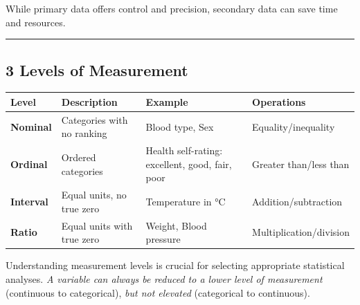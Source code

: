 \documentclass[
  letterpaper,
  DIV=11,
  numbers=noendperiod]{scrartcl}
\begin{document}
While primary data offers control and precision, secondary data can save
time and resources.

\begin{center}\rule{0.5\linewidth}{0.5pt}\end{center}

\subsection{\texorpdfstring{{3} {Levels of
Measurement}}{3 Levels of Measurement}}\label{levels-of-measurement}

\begin{longtable}[]{@{}
  >{\raggedright\arraybackslash}p{}
  >{\raggedright\arraybackslash}p{}
  >{\raggedright\arraybackslash}p{}
  >{\raggedright\arraybackslash}p{}@{}}
\toprule\noalign{}
\begin{minipage}[b]{\linewidth}\raggedright
Level
\end{minipage} & \begin{minipage}[b]{\linewidth}\raggedright
Description
\end{minipage} & \begin{minipage}[b]{\linewidth}\raggedright
Example
\end{minipage} & \begin{minipage}[b]{\linewidth}\raggedright
Operations
\end{minipage} \\
\midrule\noalign{}
\endhead
\bottomrule\noalign{}
\endlastfoot
\textbf{Nominal} & Categories with no ranking & Blood type, Sex &
Equality/inequality \\
\textbf{Ordinal} & Ordered categories & Health self-rating: excellent,
good, fair, poor & Greater than/less than \\
\textbf{Interval} & Equal units, no true zero & Temperature in °C &
Addition/subtraction \\
\textbf{Ratio} & Equal units with true zero & Weight, Blood pressure &
Multiplication/division \\
\end{longtable}

Understanding measurement levels is crucial for selecting appropriate
statistical analyses. \emph{A variable can always be reduced to a lower
level of measurement} (continuous to categorical), \emph{but not
elevated} (categorical to continuous).
\end{document}
